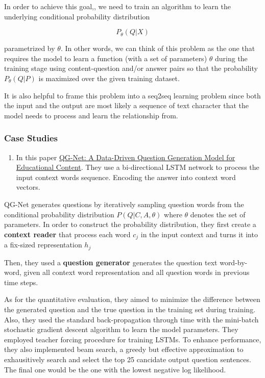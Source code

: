 \documentclass[]{book}
\providecommand{\tightlist}{%
  \setlength{\itemsep}{0pt}\setlength{\parskip}{0pt}}
\theoremstyle{definition}
\theoremstyle{definition}
\theoremstyle{definition}
\theoremstyle{remark}
\begin{document}
In order to achieve this goal,, we need to train an algorithm to learn
the underlying conditional probability distribution

\[P_{\theta}(Q|X)\]

parametrized by \(\theta\). In other words, we can think of this problem
as the one that requires the model to learn a function (with a set of
parameters) \(\theta\) during the training stage using content-question
and/or answer pairs so that the probability \(P_{\theta}(Q|P)\) is
maximized over the given training dataset.

It is also helpful to frame this problem into a seq2seq learning problem
since both the input and the output are most likely a sequence of text
character that the model needs to process and learn the relationship
from.

\subsubsection{Case Studies}\label{case-studies}

\begin{enumerate}
\def\labelenumi{\arabic{enumi}.}
\tightlist
\item
  In this paper
  \href{http://www.princeton.edu/~shitingl/papers/18l@s-qgen.pdf}{QG-Net:
  A Data-Driven Question Generation Model for Educational Content}. They
  use a bi-directional LSTM network to process the input context words
  sequence. Encoding the answer into context word vectors.
\end{enumerate}

QG-Net generates questions by iteratively sampling question words from
the conditional probability distribution \(P(Q|C,A,\theta)\) where
\(\theta\) denotes the set of parameters. In order to construct the
probability distribution, they first create a \textbf{context reader}
that process each word \(c_j\) in the input context and turns it into a
fix-sized representation \(h_j\)

Then, they used a \textbf{question generator} generates the question
text word-by-word, given all context word representation and all
question words in previous time steps.

As for the quantitative evaluation, they aimed to minimize the
difference between the generated question and the true question in the
training set during training. Also, they used the standard
back-propagation through time with the mini-batch stochastic gradient
descent algorithm to learn the model parameters. They employed teacher
forcing procedure for training LSTMs. To enhance performance, they also
implemented beam search, a greedy but effective approximation to
exhausitively search and select the top 25 cancidate output question
sentences. The final one would be the one with the lowest negative log
likelihood.
\end{document}
